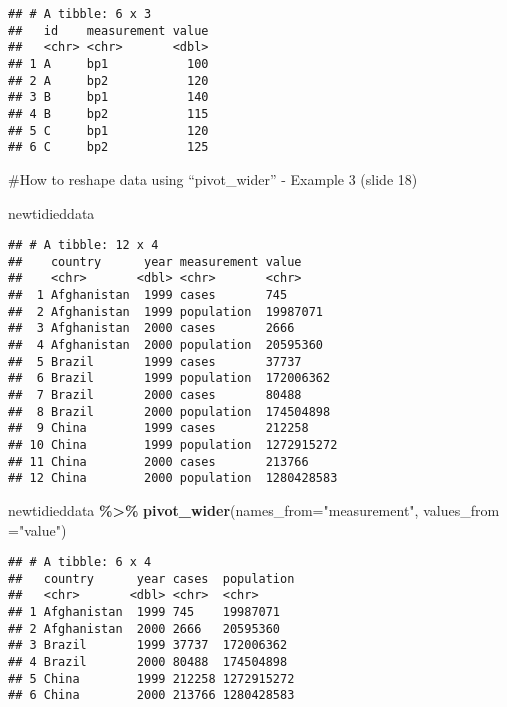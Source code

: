 \documentclass[
]{article}
\newenvironment{Shaded}{\begin{snugshade}}{\end{snugshade}}
\newcommand{\AttributeTok}[1]{\textcolor[rgb]{0.13,0.29,0.53}{#1}}
\newcommand{\FunctionTok}[1]{\textcolor[rgb]{0.13,0.29,0.53}{\textbf{#1}}}
\newcommand{\NormalTok}[1]{#1}
\newcommand{\SpecialCharTok}[1]{\textcolor[rgb]{0.81,0.36,0.00}{\textbf{#1}}}
\newcommand{\StringTok}[1]{\textcolor[rgb]{0.31,0.60,0.02}{#1}}
\begin{document}
\begin{verbatim}
## # A tibble: 6 x 3
##   id    measurement value
##   <chr> <chr>       <dbl>
## 1 A     bp1           100
## 2 A     bp2           120
## 3 B     bp1           140
## 4 B     bp2           115
## 5 C     bp1           120
## 6 C     bp2           125
\end{verbatim}

\#How to reshape data using ``pivot\_wider'' - Example 3 (slide 18)

\begin{Shaded}
\begin{Highlighting}[]
\NormalTok{newtidieddata}
\end{Highlighting}
\end{Shaded}

\begin{verbatim}
## # A tibble: 12 x 4
##    country      year measurement value     
##    <chr>       <dbl> <chr>       <chr>     
##  1 Afghanistan  1999 cases       745       
##  2 Afghanistan  1999 population  19987071  
##  3 Afghanistan  2000 cases       2666      
##  4 Afghanistan  2000 population  20595360  
##  5 Brazil       1999 cases       37737     
##  6 Brazil       1999 population  172006362 
##  7 Brazil       2000 cases       80488     
##  8 Brazil       2000 population  174504898 
##  9 China        1999 cases       212258    
## 10 China        1999 population  1272915272
## 11 China        2000 cases       213766    
## 12 China        2000 population  1280428583
\end{verbatim}

\begin{Shaded}
\begin{Highlighting}[]
\NormalTok{newtidieddata }\SpecialCharTok{\%\textgreater{}\%} \FunctionTok{pivot\_wider}\NormalTok{(}\AttributeTok{names\_from=}\StringTok{"measurement"}\NormalTok{, }
                              \AttributeTok{values\_from =}\StringTok{"value"}\NormalTok{)}
\end{Highlighting}
\end{Shaded}

\begin{verbatim}
## # A tibble: 6 x 4
##   country      year cases  population
##   <chr>       <dbl> <chr>  <chr>     
## 1 Afghanistan  1999 745    19987071  
## 2 Afghanistan  2000 2666   20595360  
## 3 Brazil       1999 37737  172006362 
## 4 Brazil       2000 80488  174504898 
## 5 China        1999 212258 1272915272
## 6 China        2000 213766 1280428583
\end{verbatim}
\end{document}
